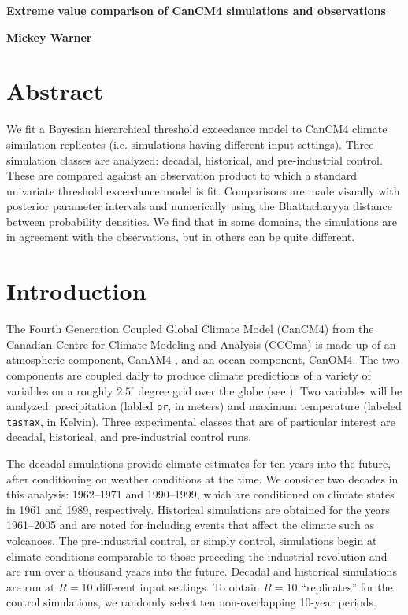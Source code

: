 \documentclass[12pt]{article}
\begin{document}
\begin{Large}
\noindent \textbf{Extreme value comparison of CanCM4 simulations and observations}
\end{Large}
\bigskip

\noindent \textbf{Mickey Warner}


\section{Abstract}
\label{abstract}
We fit a Bayesian hierarchical threshold exceedance model to CanCM4 climate simulation replicates (i.e. simulations having different input settings). Three simulation classes are analyzed: decadal, historical, and pre-industrial control. These are compared against an observation product to which a standard univariate threshold exceedance model is fit. Comparisons are made visually with posterior parameter intervals and numerically using the Bhattacharyya distance between probability densities. We find that in some domains, the simulations are in agreement with the observations, but in others can be quite different.

\section{Introduction}
\label{intro}

The Fourth Generation Coupled Global Climate Model (CanCM4) from the Canadian Centre for Climate Modeling and Analysis (CCCma) is made up of an atmospheric component, CanAM4 \citep{von2013canadian}, and an ocean component, CanOM4. The two components are coupled daily to produce climate predictions of a variety of variables on a roughly $2.5^\circ$ degree grid over the globe (see \cite{merryfield2013canadian}). Two variables will be analyzed: precipitation (labled \texttt{pr}, in meters) and maximum temperature (labeled \texttt{tasmax}, in Kelvin). Three experimental classes that are of particular interest are decadal, historical, and pre-industrial control runs.

The decadal simulations provide climate estimates for ten years into the future, after conditioning on weather conditions at the time. We consider two decades in this analysis: 1962--1971 and 1990--1999, which are conditioned on climate states in 1961 and 1989, respectively. Historical simulations are obtained for the years 1961--2005 and are noted for including events that affect the climate such as volcanoes. The pre-industrial control, or simply control, simulations begin at climate conditions comparable to those preceding the industrial revolution and are run over a thousand years into the future. Decadal and historical simulations are run at $R=10$ different input settings. To obtain $R=10$ ``replicates'' for the control simulations, we randomly select ten non-overlapping 10-year periods.
\end{document}
